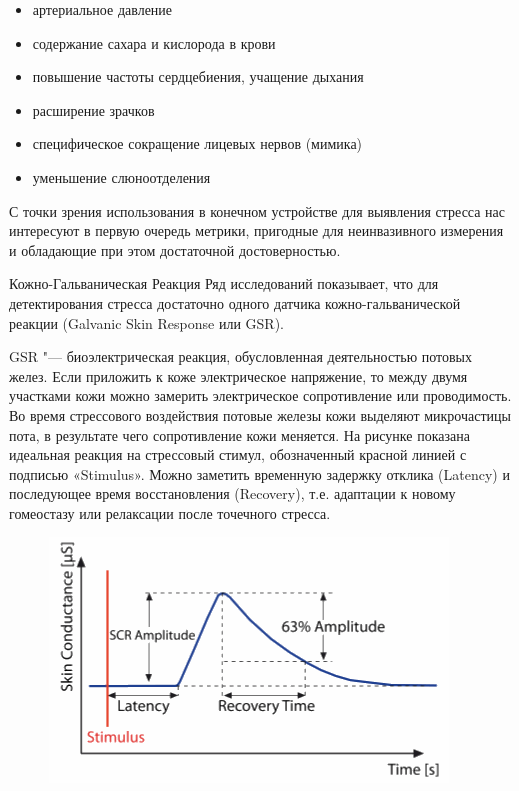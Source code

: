 \documentclass[10pt, a5paper]{article}
\begin{document}
\begin{itemize}
  \item артериальное давление
  \item содержание сахара и кислорода в крови
  \item повышение частоты сердцебиения, учащение дыхания
  \item расширение зрачков
  \item специфическое сокращение лицевых нервов (мимика)
  \item уменьшение слюноотделения
\end{itemize}

С точки зрения использования в конечном устройстве для выявления стресса нас интересуют в первую очередь метрики, пригодные для неинвазивного измерения и обладающие при этом достаточной достоверностью.

Кожно-Гальваническая Реакция
Ряд исследований показывает, что для детектирования стресса достаточно одного датчика кожно-гальванической реакции (Galvanic Skin Response или GSR).

GSR "--- биоэлектрическая реакция, обусловленная деятельностью потовых желез. Если приложить к коже электрическое напряжение, то между двумя участками кожи можно замерить электрическое сопротивление или проводимость. Во время стрессового воздействия потовые железы кожи выделяют микрочастицы пота, в результате чего сопротивление кожи меняется. На рисунке показана идеальная реакция на стрессовый стимул, обозначенный красной линией с подписью «Stimulus». Можно заметить временную задержку отклика (Latency) и последующее время восстановления (Recovery), т.е. адаптации к новому гомеостазу или релаксации после точечного стресса.

\begin{figure}[h!]
  \centering
  \includegraphics[width=\textwidth]{107_2014_w_Karabutova_plot.png}
\end{figure}
\end{document}
